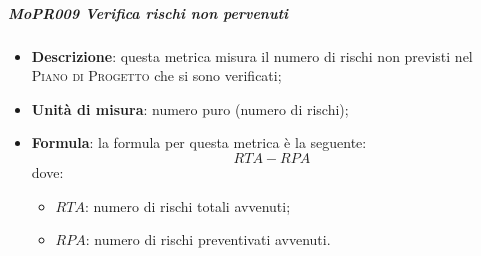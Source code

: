 \documentclass[../norme-di-progetto.tex]{subfiles}
\begin{document}
\subparagraph{MoPR009 Verifica rischi non pervenuti}
\begin{itemize}
  \item \textbf{Descrizione}: questa metrica misura il numero di rischi non previsti nel \textsc{Piano di Progetto} che si sono verificati;
  \item \textbf{Unità di misura}: numero puro (numero di rischi);
  \item \textbf{Formula}: la formula per questa metrica è la seguente:
  \begin{displaymath}
    RTA - RPA
  \end{displaymath}
  dove:
  \begin{itemize}
    \item $ RTA $: numero di rischi totali avvenuti;
    \item $ RPA $: numero di rischi preventivati avvenuti.
  \end{itemize}
\end{itemize}
\end{document}
